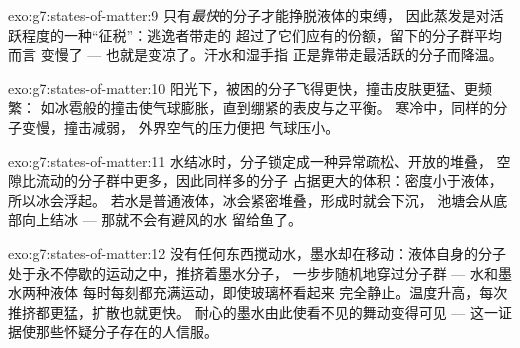 \begin{solution}{exo:g7:states-of-matter:9}
只有\emph{最快}的分子才能挣脱液体的束缚，
因此蒸发是对活跃程度的一种“征税”：逃逸者带走的
超过了它们应有的份额，留下的分子群平均而言
变慢了 --- 也就是变凉了。汗水和湿手指
正是靠带走最活跃的分子而降温。
\end{solution}

\begin{solution}{exo:g7:states-of-matter:10}
阳光下，被困的分子飞得更快，撞击皮肤更猛、更频繁：
如冰雹般的撞击使气球膨胀，直到绷紧的表皮与之平衡。
寒冷中，同样的分子变慢，撞击减弱，
外界空气的压力便把
气球压小。
\end{solution}

\begin{solution}{exo:g7:states-of-matter:11}
水结冰时，分子锁定成一种异常疏松、开放的堆叠，
空隙比流动的分子群中更多，因此同样多的分子
占据更大的体积：密度小于液体，所以冰会浮起。
若水是普通液体，冰会紧密堆叠，形成时就会下沉，
池塘会从底部向上结冰 --- 那就不会有避风的水
留给鱼了。
\end{solution}

\begin{solution}{exo:g7:states-of-matter:12}
没有任何东西搅动水，墨水却在移动：液体自身的分子
处于永不停歇的运动之中，推挤着墨水分子，
一步步随机地穿过分子群 --- 水和墨水两种液体
每时每刻都充满运动，即使玻璃杯看起来
完全静止。温度升高，每次推挤都更猛，扩散也就更快。
耐心的墨水由此使看不见的舞动变得可见 ---
这一证据使那些怀疑分子存在的人信服。
\end{solution}


